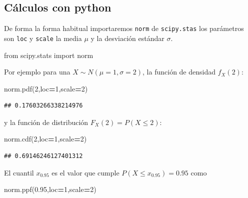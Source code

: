 \documentclass[]{book}
\newenvironment{Shaded}{\begin{snugshade}}{\end{snugshade}}
\newcommand{\DecValTok}[1]{\textcolor[rgb]{0.00,0.00,0.81}{#1}}
\newcommand{\FloatTok}[1]{\textcolor[rgb]{0.00,0.00,0.81}{#1}}
\newcommand{\ImportTok}[1]{#1}
\newcommand{\NormalTok}[1]{#1}
\newcommand{\OperatorTok}[1]{\textcolor[rgb]{0.81,0.36,0.00}{\textbf{#1}}}
\begin{document}
\hypertarget{cuxe1lculos-con-python}{%
\subsection{Cálculos con python}\label{cuxe1lculos-con-python}}

De forma la forma habitual importaremos \texttt{norm} de \texttt{scipy.stas} los parámetros son \texttt{loc} y \texttt{scale} la media \(\mu\) y la desviación estándar \(\sigma\).

\begin{Shaded}
\begin{Highlighting}[]
\ImportTok{from}\NormalTok{ scipy.stats }\ImportTok{import}\NormalTok{ norm}
\end{Highlighting}
\end{Shaded}

Por ejemplo para una \(X\sim N(\mu=1,\sigma=2)\), la función de densidad \(f_X(2)\):

\begin{Shaded}
\begin{Highlighting}[]
\NormalTok{norm.pdf(}\DecValTok{2}\NormalTok{,loc}\OperatorTok{=}\DecValTok{1}\NormalTok{,scale}\OperatorTok{=}\DecValTok{2}\NormalTok{)}
\end{Highlighting}
\end{Shaded}

\begin{verbatim}
## 0.17603266338214976
\end{verbatim}

y la función de distribución \(F_X(2) = P(X\leq 2)\):

\begin{Shaded}
\begin{Highlighting}[]
\NormalTok{norm.cdf(}\DecValTok{2}\NormalTok{,loc}\OperatorTok{=}\DecValTok{1}\NormalTok{,scale}\OperatorTok{=}\DecValTok{2}\NormalTok{)}
\end{Highlighting}
\end{Shaded}

\begin{verbatim}
## 0.69146246127401312
\end{verbatim}

El cuantil \(x_{0.95}\) es el valor que cumple \(P(X\leq x_{0.95})=0.95\) como

\begin{Shaded}
\begin{Highlighting}[]
\NormalTok{norm.ppf(}\FloatTok{0.95}\NormalTok{,loc}\OperatorTok{=}\DecValTok{1}\NormalTok{,scale}\OperatorTok{=}\DecValTok{2}\NormalTok{)}
\end{Highlighting}
\end{Shaded}
\end{document}
